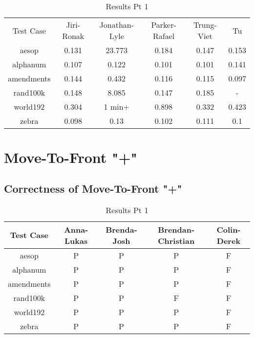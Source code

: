 \documentclass[12pt]{article}
\begin{document}
\begin{table}[ht]
\caption{Results Pt 1}%
\centering %
\begin{tabular}{c c c c c c}%
\hline \hline                        %
Test Case & Jiri-Ronak & Jonathan-Lyle & Parker-Rafael & Trung-Viet & Tu \\ [0.5ex]

aesop & 0.131 & 23.773 & 0.184 & 0.147 & 0.153\\
alphanum & 0.107 & 0.122 & 0.101 & 0.101 & 0.141\\
amendments & 0.144 & 0.432 & 0.116 & 0.115 & 0.097\\
rand100k & 0.148 & 8.085 & 0.147 & 0.185 & - \\
world192 & 0.304 & 1 min+ & 0.898 & 0.332 & 0.423\\
zebra & 0.098 & 0.13 & 0.102 & 0.111 & 0.1\\
\hline                  %
\end{tabular}
\label{table:nonlin}
\end{table}






\newpage
\section{Move-To-Front "+"}

\subsection{Correctness of Move-To-Front "+"}

\begin{table}[ht]
\caption{Results Pt 1}%
\centering %
\begin{tabular}{c c c c c}%
\hline \hline                        %
Test Case & Anna-Lukas & Brenda-Josh & Brendan-Christian & Colin-Derek \\ [0.5ex]%
\hline                  %
aesop & P & P & P & F \\  %
alphanum & P & P & P & F \\
amendments & P & P & P & F \\
rand100k & P & P & F & F \\
world192 & P & P & P & F \\
zebra & P & P & P & F \\
\hline                  %
\end{tabular}
\label{table:nonlin}
\end{table}
\end{document}
